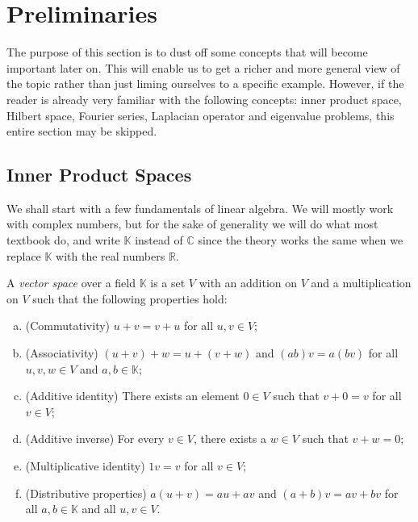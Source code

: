 
\section{Preliminaries}\label{kugel:sec:preliminaries}

The purpose of this section is to dust off some concepts that will become
important later on. This will enable us to get a richer and more general view
of the topic rather than just liming ourselves to a specific example.
However, if the reader is already very familiar with the following concepts:
inner product space, Hilbert space, Fourier series, Laplacian operator and
eigenvalue problems, this entire section may be skipped.

\subsection{Inner Product Spaces}

We shall start with a few fundamentals of linear algebra. We will mostly work
with complex numbers, but for the sake of generality we will do what most
textbook do, and write \(\mathbb{K}\) instead of \(\mathbb{C}\) since the
theory works the same when we replace \(\mathbb{K}\) with the real
numbers \(\mathbb{R}\).

\begin{definition}
  \label{kugel:def:vector-space} \nocite{axler_linear_2014}
  A \emph{vector space} over a field \(\mathbb{K}\) is a set \(V\) with an
  addition on \(V\) and a multiplication on \(V\) such that the following
  properties hold:
  \begin{enumerate}[(a)]
    \item (Commutativity) \(u + v = v + u\) for all \(u, v \in V\);
    \item (Associativity) \((u + v) + w = u + (v + w)\) and \((ab)v = a(bv)\)
      for all \(u, v, w \in V\) and \(a, b \in \mathbb{K}\);
    \item (Additive identity) There exists an element \(0 \in V\) such that
      \(v + 0 = v\) for all \(v \in V\);
    \item (Additive inverse) For every \(v \in V\), there exists a \(w \in V\)
      such that \(v + w = 0\);
    \item (Multiplicative identity) \(1 v = v\) for all \(v \in V\);
    \item (Distributive properties) \(a(u + v) = au + av\) and \((a + b)v = av +
      bv\) for all \(a, b \in \mathbb{K}\) and all \(u,v \in V\).
  \end{enumerate}
\end{definition}

